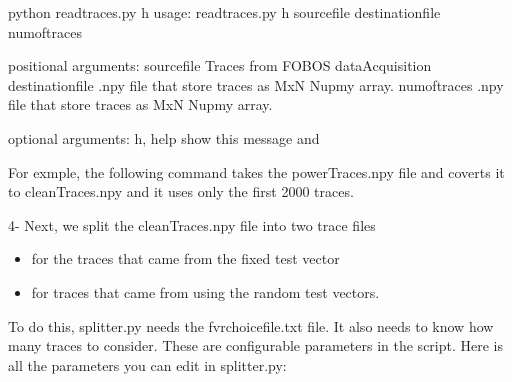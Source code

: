 \documentclass[letterpaper,10pt,english]{sphinxmanual}
\begin{document}
\begin{sphinxVerbatim}[commandchars=\\\{\}]
\PYGZdl{} python read\PYGZus{}traces.py \PYGZhy{}h
usage: read\PYGZus{}traces.py \PYG{o}{[}\PYGZhy{}h\PYG{o}{]} source\PYGZus{}file destination\PYGZus{}file num\PYGZus{}of\PYGZus{}traces

positional arguments:
source\PYGZus{}file       Traces from FOBOS dataAcquisition
destination\PYGZus{}file  .npy file that store traces as MxN Nupmy array.
num\PYGZus{}of\PYGZus{}traces     .npy file that store traces as MxN Nupmy array.

optional arguments:
\PYGZhy{}h, \PYGZhy{}\PYGZhy{}help        show this  message and 
\end{sphinxVerbatim}

For exmple, the following command takes the powerTraces.npy file and coverts it to cleanTraces.npy and it uses only the
first 2000 traces.

\begin{sphinxVerbatim}[commandchars=\\\{\}]
    
\end{sphinxVerbatim}

4-  Next, we split the cleanTraces.npy file into two trace files
\begin{itemize}
\item {} 
 for the traces that came from the fixed test vector

\item {} 
 for traces that came from using the random test vectors.

\end{itemize}

To do this, splitter.py needs the fvrchoicefile.txt file. It also needs to know how many traces to consider.
These are configurable parameters in the script. Here is all the parameters you can edit in splitter.py:

\begin{sphinxVerbatim}[commandchars=\\\{\}]
  
  
  
  
\end{sphinxVerbatim}
\end{document}
